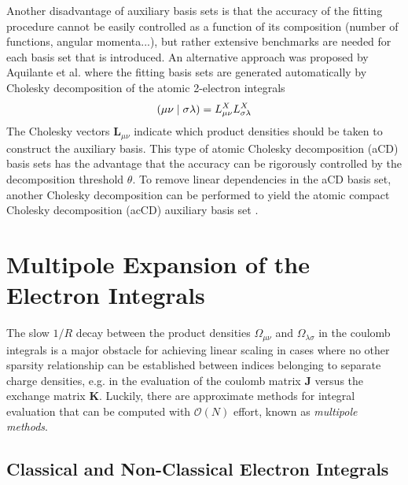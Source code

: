 Another disadvantage of auxiliary basis sets is that the accuracy of the fitting procedure cannot be easily controlled as a function of its composition (number of functions, angular momenta...), but rather extensive benchmarks are needed for each basis set that is introduced. An alternative approach was proposed by Aquilante et al. \cite{Aqu2007} where the fitting basis sets are generated automatically by Cholesky decomposition of the atomic 2-electron integrals
\begin{equation}
\left( \mu\nu \mid \sigma\lambda \right) = L^X_{\mu\nu} L^X_{\sigma\lambda}
\end{equation}
\noindent The Cholesky vectors $\mathbf{L}_{\mu\nu}$ indicate which product densities should be taken to construct the auxiliary basis. This type of atomic Cholesky decomposition (aCD) basis sets has the advantage that the accuracy can be rigorously controlled by the decomposition threshold $\theta$. To remove linear dependencies in the aCD basis set, another Cholesky decomposition can be performed to yield the atomic compact Cholesky decomposition (acCD) auxiliary basis set \cite{Aqu2009}.


\section{Multipole Expansion of the Electron Integrals}

The slow $1/R$ decay between the product densities $\Omega_{\mu\nu}$ and $\Omega_{\lambda\sigma}$ in the coulomb integrals is a major obstacle for achieving linear scaling in cases where no other sparsity relationship can be established between indices belonging to separate charge densities, e.g. in the evaluation of the coulomb matrix $\mathbf{J}$ versus the exchange matrix $\mathbf{K}$. Luckily, there are approximate methods for integral evaluation that can be computed with $\mathcal{O}(N)$ effort, known as \emph{multipole methods}.

\subsection{Classical and Non-Classical Electron Integrals}

